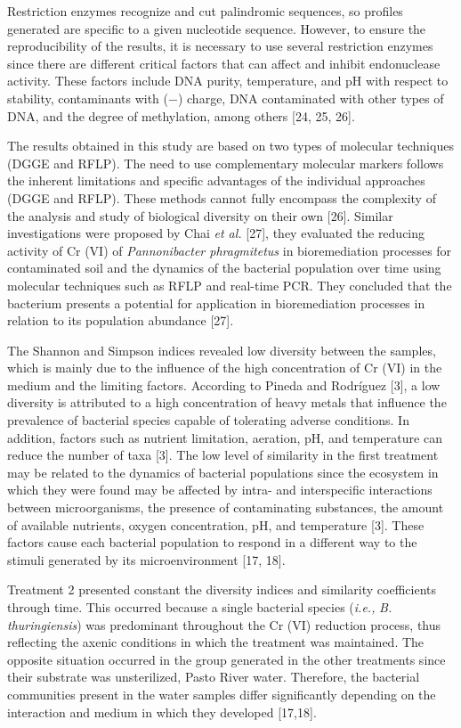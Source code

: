 \documentclass{univsciauth}
\begin{document}
Restriction enzymes recognize and cut palindromic sequences, so profiles
generated are specific to a given nucleotide sequence. However, to
ensure the reproducibility of the results, it is necessary to use
several restriction enzymes since there are different critical factors
that can affect and inhibit endonuclease activity. These factors include
DNA purity, temperature, and pH with respect to stability, contaminants
with ($-$) charge, DNA contaminated with other types of DNA, and the
degree of methylation, among others {[}24, 25, 26{]}.

The results obtained in this study are based on two types of molecular
techniques (DGGE and RFLP). The need to use complementary molecular
markers follows the inherent limitations and specific advantages of the
individual approaches (DGGE and RFLP). These methods cannot fully
encompass the complexity of the analysis and study of biological
diversity on their own {[}26{]}. Similar investigations were proposed by
Chai \emph{et al.} {[}27{]}, they evaluated the reducing activity of Cr
(VI) of \emph{Pannonibacter phragmitetus} in bioremediation processes
for contaminated soil and the dynamics of the bacterial population over
time using molecular techniques such as RFLP and real-time PCR. They
concluded that the bacterium presents a potential for application in
bioremediation processes in relation to its population abundance
{[}27{]}.

The Shannon and Simpson indices revealed low diversity between the
samples, which is mainly due to the influence of the high concentration
of Cr (VI) in the medium and the limiting factors. According to Pineda
and Rodríguez {[}3{]}, a low diversity is attributed to a high
concentration of heavy metals that influence the prevalence of bacterial
species capable of tolerating adverse conditions. In addition, factors
such as nutrient limitation, aeration, pH, and temperature can reduce
the number of taxa {[}3{]}. The low level of similarity in the first
treatment may be related to the dynamics of bacterial populations since
the ecosystem in which they were found may be affected by intra- and
interspecific interactions between microorganisms, the presence of
contaminating substances, the amount of available nutrients, oxygen
concentration, pH, and temperature {[}3{]}. These factors cause each
bacterial population to respond in a different way to the stimuli
generated by its microenvironment {[}17, 18{]}.

Treatment 2 presented constant the diversity indices and similarity
coefficients through time. This occurred because a single bacterial
species (\emph{i.e.,} \emph{B. thuringiensis}) was predominant
throughout the Cr (VI) reduction process, thus reflecting the axenic
conditions in which the treatment was maintained. The opposite situation
occurred in the group generated in the other treatments since their
substrate was unsterilized, Pasto River water. Therefore, the bacterial
communities present in the water samples differ significantly depending
on the interaction and medium in which they developed {[}17,18{]}.
\end{document}
